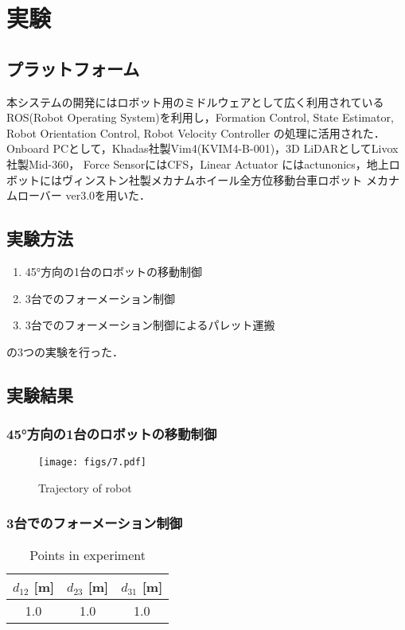 \documentclass[a4jsme]{jsmepaper}
\begin{document}
\section{実験}


\subsection{プラットフォーム}
本システムの開発にはロボット用のミドルウェアとして広く利用されているROS(Robot Operating System)を利用し，Formation Control, State Estimator, Robot Orientation Control, Robot Velocity Controller の処理に活用された．
Onboard PCとして，Khadas社製Vim4(KVIM4-B-001)，3D LiDARとしてLivox社製Mid-360， Force SensorにはCFS，Linear Actuator にはactunonics，地上ロボットにはヴィンストン社製メカナムホイール全方位移動台車ロボット メカナムローバー ver3.0を用いた．

\subsection{実験方法}
\begin{enumerate}[label=(\alph*)]
  \item 45°方向の1台のロボットの移動制御
  \item 3台でのフォーメーション制御
  \item 3台でのフォーメーション制御によるパレット運搬
\end{enumerate}

の3つの実験を行った．

\subsection{実験結果}
\subsubsection{45°方向の1台のロボットの移動制御}
\begin{figure}[htbp]
  \begin{center}
  \vspace{1zh}
    \texttt{[image: figs/7.pdf]}
  \end{center}
  \caption{Trajectory of robot}
  \label{fig:fig7}
\end{figure}

\subsubsection{3台でのフォーメーション制御}
\begin{table}[htbp]
    \caption{Points in experiment}
    \label{table1}
    \centering
    \begin{tabular}{ccc} \hline
      $d_{12}$ [m] & $d_{23}$ [m] & $d_{31}$ [m] \\ \hline
      1.0 & 1.0 & 1.0 \\ \hline
    \end{tabular}
\end{table}
\end{document}
